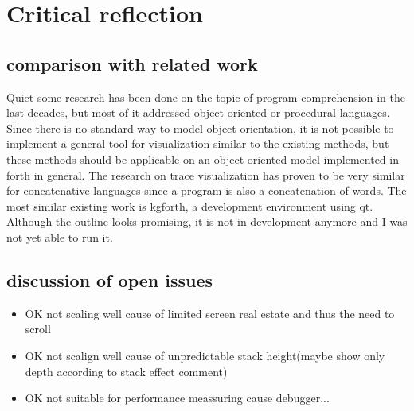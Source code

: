 \chapter{Critical reflection}

\section{comparison with related work}

Quiet some research has been done on the topic of program comprehension in the last decades, but most of it addressed object oriented or procedural languages. Since there is no standard way to model object orientation, it is not possible to implement a general tool for visualization similar to the existing methods, but these methods should be applicable on an object oriented model implemented in forth in general. The research on trace visualization has proven to be very similar for concatenative languages since a program is also a concatenation of words. 
The most similar existing work is kgforth, a development environment using qt. Although the outline looks promising, it is not in development anymore and I was not yet able to run it.

\section{discussion of open issues}

\begin{itemize}
\item OK not scaling well cause of limited screen real estate and thus the need to scroll
\item OK not scalign well cause of unpredictable stack height(maybe show only depth according to stack effect comment)
\item OK not suitable for performance meassuring cause debugger...
\end{itemize}

